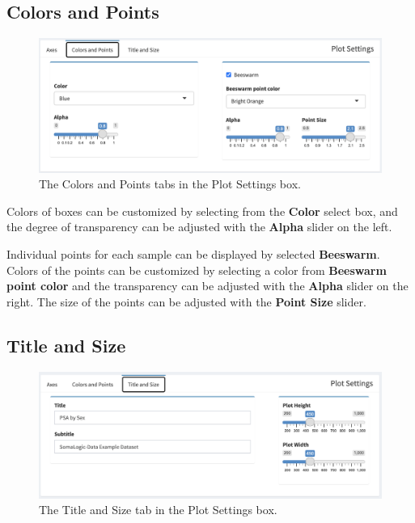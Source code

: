 \documentclass[
]{book}
\begin{document}
\hypertarget{colors-and-points}{%
\subsection{Colors and Points}\label{colors-and-points}}

\begin{figure}
\centering
\includegraphics{images/Boxplot_ColorsPoints.png}
\caption{The Colors and Points tabs in the Plot Settings box.}
\end{figure}

Colors of boxes can be customized by selecting from the \textbf{Color} select box, and the degree of transparency can be adjusted with the \textbf{Alpha} slider on the left.

Individual points for each sample can be displayed by selected \textbf{Beeswarm}. Colors of the points can be customized by selecting a color from \textbf{Beeswarm point color} and the transparency can be adjusted with the \textbf{Alpha} slider on the right. The size of the points can be adjusted with the \textbf{Point Size} slider.

\hypertarget{title-and-size}{%
\subsection{Title and Size}\label{title-and-size}}

\begin{figure}
\centering
\includegraphics{images/Boxplot_TitleSize.png}
\caption{The Title and Size tab in the Plot Settings box.}
\end{figure}
\end{document}
